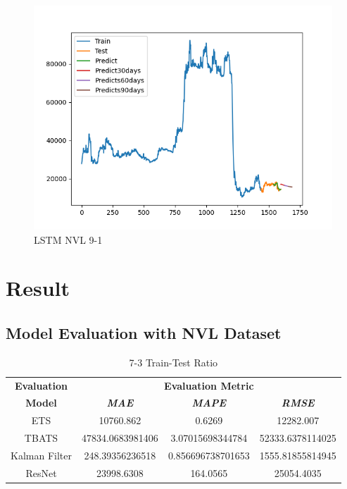 \documentclass[conference]{IEEEtran}
\begin{document}
\begin{figure}[htbp]
\begin{minipage}{0.23\textwidth}
    \includegraphics[width=1\textwidth]{experiment/ltsm/Team4_LSTM_NVL_9_1.png}
    \caption{LSTM NVL 9-1}
    \label{fig:nvl_histogram}
    \end{minipage}
\end{figure}

\newpage

\section{Result}

\subsection{Model Evaluation with NVL Dataset}

\begin{table}[htbp]
\caption{7-3 Train-Test Ratio}
\begin{center}
\begin{tabular}{|c|c|c|c|}
\hline
\textbf{Evaluation}&\multicolumn{3}{|c|}{\textbf{Evaluation Metric}} \\
\cline{2-4} 
\textbf{Model} & \textbf{\textit{MAE}}& \textbf{\textit{MAPE}}& \textbf{\textit{RMSE}} \\
\hline
ETS & 10760.862 & 0.6269 & 12282.007\\
\hline
TBATS & 47834.0683981406 & 3.07015698344784 & 52333.6378114025\\
\hline
Kalman Filter & 248.39356236518 & 0.856696738701653 & 1555.81855814945\\
\hline
ResNet & 23998.6308 & 164.0565 & 25054.4035\\
\hline
\end{tabular}
\label{tab1}
\end{center}
\end{table}
\end{document}
